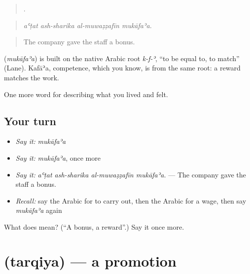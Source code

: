 \begin{quote}
   .
\end{quote}

\begin{quote}
\emph{aʿṭat ash-sharika al-muwaẓẓafīn mukāfaʾa.}
\end{quote}

\begin{quote}
The company gave the staff a bonus.
\end{quote}

\begin{cousinweb}
\textbf{} (\emph{mukāfaʾa}) is built on the native Arabic root \emph{k-f-ʾ}, \textquotedblleft{}to be equal to, to match\textquotedblright{} (Lane). Kafāʾa, competence, which you know, is from the same root: a reward matches the work.
\end{cousinweb}

\begin{grammarlens}[title={What you've built}]
One more word for describing what you lived and felt.
\end{grammarlens}

\subsection*{Your turn}
\begin{itemize}
\raggedright
  \item \emph{Say it:} \emph{mukāfaʾa}
  \item \emph{Say it:} \emph{mukāfaʾa}, once more
  \item \emph{Say it:} \emph{aʿṭat ash-sharika al-muwaẓẓafīn mukāfaʾa.} — The company gave the staff a bonus.
  \item \emph{Recall:} say the Arabic for to carry out, then the Arabic for a wage, then say \emph{mukāfaʾa} again
\end{itemize}

\begin{tcolorbox}[breakable,colback=teal!4,colframe=teal!35!black,title={Before you move on}]
What does  mean? (\textquotedblleft{}A bonus, a reward\textquotedblright{}.) Say it once more.
\end{tcolorbox}
\section[\texorpdfstring{\ar{ترقية} (tarqiya)}{ترقية (tarqiya)}]{ (tarqiya) — a promotion}

